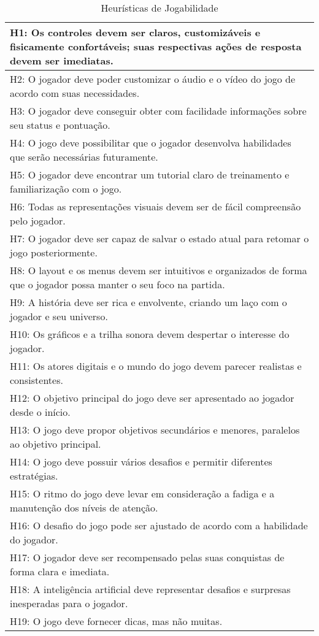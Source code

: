 \begin{table}[H]
\centering
\caption{Heurísticas de Jogabilidade}
\label{tab:heuristica}
\begin{tabular}{|p{15cm}|}
\hline
H1: Os controles devem ser claros, customizáveis e fisicamente confortáveis; suas respectivas ações de resposta devem ser imediatas. \\ \hline
H2: O jogador deve poder customizar o áudio e o vídeo do jogo de acordo com suas necessidades.                                       \\ \hline
H3: O jogador deve conseguir obter com facilidade informações sobre seu status e pontuação.                                          \\ \hline
H4: O jogo deve possibilitar que o jogador desenvolva habilidades que serão necessárias futuramente.                                 \\ \hline
H5: O jogador deve encontrar um tutorial claro de treinamento e familiarização com o jogo.                                           \\ \hline
H6: Todas as representações visuais devem ser de fácil compreensão pelo jogador.                                                     \\ \hline
H7: O jogador deve ser capaz de salvar o estado atual para retomar o jogo posteriormente.                                            \\ \hline
H8: O layout e os menus devem ser intuitivos e organizados de forma que o jogador possa manter o seu foco na partida.                \\ \hline
H9: A história deve ser rica e envolvente, criando um laço com o jogador e seu universo. \\ \hline
H10: Os gráficos e a trilha sonora devem despertar o interesse do jogador. \\ \hline
H11: Os atores digitais e o mundo do jogo devem parecer realistas e consistentes. \\ \hline
H12: O objetivo principal do jogo deve ser apresentado ao jogador desde o início. \\ \hline
H13: O jogo deve propor objetivos secundários e menores, paralelos ao objetivo principal. \\ \hline
H14: O jogo deve possuir vários desafios e permitir diferentes estratégias. \\ \hline
H15: O ritmo do jogo deve levar em consideração a fadiga e a manutenção dos níveis de atenção. \\ \hline
H16: O desafio do jogo pode ser ajustado de acordo com a habilidade do jogador. \\ \hline
H17: O jogador deve ser recompensado pelas suas conquistas de forma clara e imediata. \\ \hline
H18: A inteligência artificial deve representar desafios e surpresas inesperadas para o jogador. \\ \hline
H19: O jogo deve fornecer dicas, mas não muitas. \\ \hline
\end{tabular}
\end{table}

